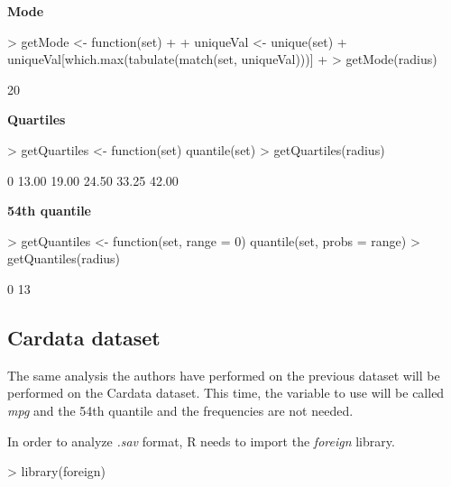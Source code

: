 \documentclass[a4paper]{article}
\begin{document}
\textbf{Mode}
\begin{Schunk}
\begin{Sinput}
> getMode <- function(set)
+ {
+ uniqueVal <- unique(set)
+ uniqueVal[which.max(tabulate(match(set, uniqueVal)))]
+ }
> getMode(radius)
\end{Sinput}
\begin{Soutput}
[1] 20
\end{Soutput}
\end{Schunk}

\textbf{Quartiles}
\begin{Schunk}
\begin{Sinput}
> getQuartiles <- function(set) {quantile(set)}
> getQuartiles(radius)
\end{Sinput}
\begin{Soutput}
   0%   25%   50%   75%  100% 
13.00 19.00 24.50 33.25 42.00 
\end{Soutput}
\end{Schunk}

\textbf{54th quantile}
\begin{Schunk}
\begin{Sinput}
> getQuantiles <- function(set, range = 0) {quantile(set, probs = range)}
> getQuantiles(radius)
\end{Sinput}
\begin{Soutput}
0% 
13 
\end{Soutput}
\end{Schunk}


\subsection*{Cardata dataset}

The same analysis the authors have performed on the previous dataset will be
performed on the Cardata dataset. This time, the variable to use will be called
\textit{mpg} and the 54th quantile and the frequencies are not needed.


In order to analyze \textit{.sav} format, R needs to import the \textit{foreign}
library. 

\begin{Schunk}
\begin{Sinput}
> library(foreign)
\end{Sinput}
\end{Schunk}
\end{document}
